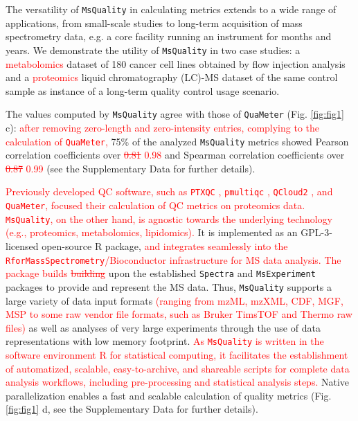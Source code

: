 \documentclass[unnumsec,webpdf,contemporary,large]{oup-authoring-template}%
\theoremstyle{thmstyleone}%
\theoremstyle{thmstyletwo}%
\theoremstyle{thmstylethree}%
\begin{document}
The versatility of \texttt{MsQuality} in calculating metrics extends to a wide range of
applications, from small-scale studies to long-term acquisition of mass spectrometry
data, e.g. a core facility running an instrument for months and years. 
We demonstrate the utility of \texttt{MsQuality} in two case studies: a 
\textcolor{red}{metabolomics}
dataset of 180 cancer cell lines obtained by flow injection analysis
\citep{Cherkaoui2022} and a \textcolor{red}{proteomics} liquid chromatography
 (LC)-MS dataset of the same 
control sample \citep{Amidan2014} as instance of a long-term quality control 
usage scenario. 

The values computed by \texttt{MsQuality}
agree with those of \texttt{QuaMeter} \citep{Ma2012} (Fig. \ref{fig:fig1} c): 
\textcolor{red}{after removing zero-length and zero-intensity entries, complying
to the calculation of \texttt{QuaMeter},}
75\% of the analyzed \texttt{MsQuality} metrics showed Pearson correlation 
coefficients over \textcolor{red}{\sout{0.81} 0.98} and Spearman correlation coefficients 
over \textcolor{red}{\sout{0.87} 0.99} (see the Supplementary Data for further details).

\textcolor{red}{Previously developed QC software, such as \texttt{PTXQC} \citep{Bielow2016}, 
\texttt{pmultiqc} \citep{Riverol2023}, \texttt{QCloud2} \citep{Olivella2021}, and \texttt{QuaMeter}, 
focused their calculation of QC metrics on proteomics data. \texttt{MsQuality}, on the other hand, is 
agnostic towards the underlying technology (e.g., proteomics, metabolomics, lipidomics).}
It is implemented as an GPL-3-licensed open-source R package, 
\textcolor{red}{and integrates seamlessly into the 
\texttt{RforMassSpectrometry}/Bioconductor infrastructure for MS data analysis.}
\textcolor{red}{The package builds} \textcolor{red}{\sout{building}} 
upon the established \texttt{Spectra} and \texttt{MsExperiment} packages
\citep{Rainer2022} to provide and represent the MS data. Thus, \texttt{MsQuality} 
supports a large variety of data input formats
\textcolor{red}{(ranging from mzML, mzXML, CDF, MGF, MSP to some raw vendor 
file formats, such as Bruker TimsTOF and Thermo raw files)}
as well as analyses of very large experiments through the use of data
representations with low memory footprint. 
\textcolor{red}{As \texttt{MsQuality} is written in the software environment R for statistical computing, it facilitates 
the establishment of automatized, scalable, easy-to-archive, and shareable scripts for complete 
data analysis workflows, including pre-processing and statistical analysis steps.}
Native parallelization enables a fast
and scalable calculation of quality metrics (Fig. \ref{fig:fig1} d, 
see the Supplementary Data for further details).
\end{document}
